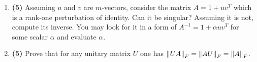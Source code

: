 \begin{enumerate}
\item \textbf{(5)} Assuming $u$ and $v$ are $m$-vectors, consider the matrix $A=1+u v^T$ which is a rank-one perturbation of identity. Can it be singular? Assuming it is not, compute its inverse. You may look for it in a form of $A^{-1}=1+\alpha u v^T$ for some scalar $\alpha$ and evaluate $\alpha$.

\item \textbf{(5)} Prove that for any unitary matrix $U$ one has $\left\lVert UA\right\rVert_F=\left\lVert AU\right\rVert_F=\left\lVert A\right\rVert_F$.

\begin{comment}
\item \textbf{(5)} In this exercise, you are expected to use vectorized NumPy operations as much as possible.
     \begin{itemize}
         \item Generate a random matrix:
\lstset{language=Python}
\lstset{frame=lines}
\lstset{label={lst:code_direct}}
\lstset{basicstyle=\ttfamily}
\begin{lstlisting}
n = 100
A = np.random.normal(size=(n, n))
\end{lstlisting}
\item Plot the distribution function of the angles $\angle (a_i, a_j)$ where $a_i$ are columns of the matrix $a$ and $i\ne j$. How does the standard deviation of this distribution decay with $n$ (check this empirically)?
\item Construct the matrix $a^\prime$ with column vectors obtained by normalizing the columns of $a$.
\end{itemize}
\end{comment}


\end{enumerate}
